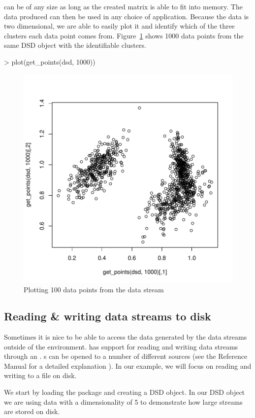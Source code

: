 \documentclass[nojss]{jss}
\begin{document}
 can be of any size as long as the created matrix is able to fit into memory. The data produced can then be used in any choice of application. Because the data is two dimensional, we are able to easily plot it and identify which of the three clusters each data point comes from. Figure~\ref{figure:plot1} shows 1000 data points from the same DSD object with the identifiable clusters.

\begin{Schunk}
\begin{Sinput}
> plot(get_points(dsd, 1000))
\end{Sinput}
\end{Schunk}

\begin{figure}
\centering
\includegraphics[width=.5\linewidth]{stream-plot1}
\caption{Plotting 100 data points from the data stream}
\label{figure:plot1}
\end{figure}

\subsection{Reading \& writing data streams to disk}
\label{examples:disk}

Sometimes it is nice to be able to access the data generated by the data streams outside of the  environment.  has support for reading and writing data streams through an  . s can be opened to a number of different sources (see the  Reference Manual for a detailed explanation \citep{stream:R:2005}). In our example, we will focus on reading and writing to a file on disk.

We start by loading the package and creating a DSD object. In our DSD object we are using data with a dimensionality of 5 to demonstrate how large streams are stored on disk.
\end{document}
